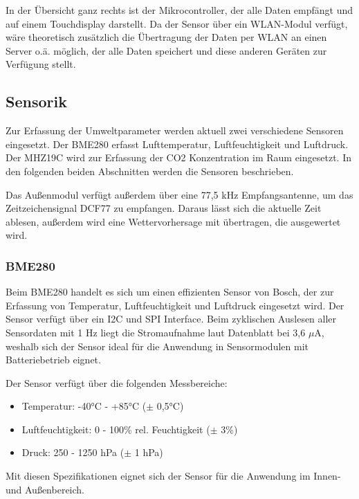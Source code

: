 \documentclass[a4paper,11pt]{article}
\begin{document}
\vspace{0.2cm}
\noindent
In der Übersicht ganz rechts ist der Mikrocontroller, der alle Daten empfängt und auf einem Touchdisplay darstellt. Da der Sensor über ein WLAN-Modul verfügt, wäre theoretisch
zusätzlich die Übertragung der Daten per WLAN an einen Server o.ä. möglich, der alle Daten speichert und diese anderen Geräten zur Verfügung stellt. 

\subsection{Sensorik}
\label{subsub:sensorik}

Zur Erfassung der Umweltparameter werden aktuell zwei verschiedene Sensoren eingesetzt. Der BME280 erfasst Lufttemperatur, Luftfeuchtigkeit und Luftdruck. 
Der MHZ19C wird zur Erfassung der CO2 Konzentration im Raum eingesetzt. In den folgenden beiden Abschnitten werden die Sensoren beschrieben. 

\vspace{0.2cm}
\noindent
Das Außenmodul verfügt außerdem über eine 77,5 kHz Empfangsantenne, um das Zeitzeichensignal DCF77 zu empfangen. Daraus lässt sich die aktuelle Zeit ablesen,
außerdem wird eine Wettervorhersage mit übertragen, die ausgewertet wird. 

\subsubsection{BME280}
\label{subsubsub:bme280}

Beim BME280 handelt es sich um einen effizienten Sensor von Bosch, der zur Erfassung von Temperatur, Luftfeuchtigkeit und Luftdruck eingesetzt wird. 
Der Sensor verfügt über ein I2C und SPI Interface.
Beim zyklischen Auslesen aller Sensordaten mit 1 Hz liegt die Stromaufnahme laut Datenblatt bei 3,6 $\mu$A, weshalb sich der Sensor ideal für die Anwendung in Sensormodulen mit Batteriebetrieb eignet. 

\noindent
Der Sensor verfügt über die folgenden Messbereiche:
\begin{itemize}
  \item Temperatur: -40°C - +85°C ($\pm$ 0,5°C)
  \item Luftfeuchtigkeit: 0 - 100\% rel. Feuchtigkeit ($\pm$ 3\%)
  \item Druck: 250 - 1250 hPa ($\pm$ 1 hPa)
\end{itemize}

\noindent
Mit diesen Spezifikationen eignet sich der Sensor für die Anwendung im Innen- und Außenbereich. 
\end{document}
